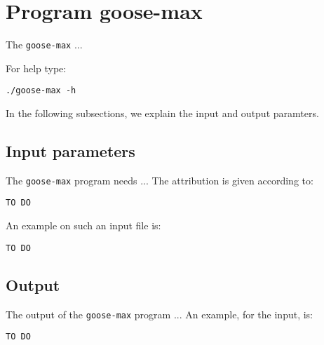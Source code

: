 \section{Program goose-max}
The \texttt{goose-max} ...

For help type:
\begin{lstlisting}
./goose-max -h
\end{lstlisting}
In the following subsections, we explain the input and output paramters.

\subsection*{Input parameters}

The \texttt{goose-max} program needs ...
The attribution is given according to:
\begin{lstlisting}
TO DO
\end{lstlisting}

An example on such an input file is:
\begin{lstlisting}
TO DO
\end{lstlisting}

\subsection*{Output}
The output of the \texttt{goose-max} program ...
An example, for the input, is:
\begin{lstlisting}
TO DO
\end{lstlisting}